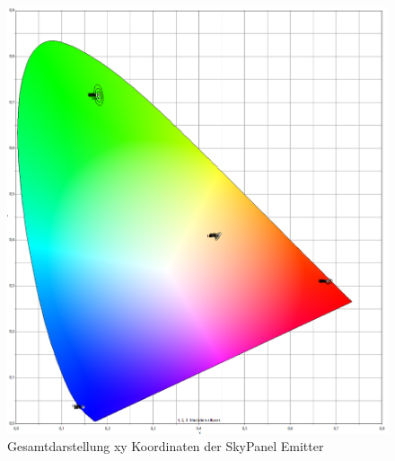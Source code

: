 \documentclass[11pt]{scrartcl}
\begin{document}
\begin{figure}[H]
    \begin{center}
        \includegraphics[width=\textwidth]{images/macAdam/skypanelTotal.png}
    \end{center}
    \caption{Gesamtdarstellung xy Koordinaten der SkyPanel Emitter}
\end{figure}
\end{document}
